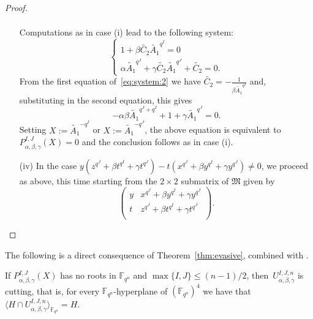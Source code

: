 \begin{proof}
\begin{enumerate}
\begin{equation*}
\begin{split}
\end{split}
\end{equation*}
Computations as in case (i) lead to the following system:
\begin{equation}
\label{eq:system:2}
    \begin{cases}
    1 + \beta \tilde{C_2} \tilde{A_1}^{q^I} = 0 \\
    \alpha \tilde{A_1}^{q^J} + \gamma \tilde{C_2} \tilde{A_1}^{q^J} + \tilde{C_2} = 0.
    \end{cases}
\end{equation}
From the first equation of~\eqref{eq:system:2} we  have $\tilde{C_2} = -\frac{1}{\beta \tilde{A_1}^{q^I}}$ and, substituting in the second equation, this gives
\begin{equation*}
     -\alpha\beta \tilde{A_1}^{q^J + q^I} + 1 + \gamma \tilde{A_1}^{q^J} = 0.
\end{equation*}
Setting $X:= \tilde{A_1}^{-q^{I}}$ or $X:= \tilde{A_1}^{-q^{J}}$, the above equation is equivalent to   $P_{\alpha,\beta,\gamma}^{I,J}(X)=0$
and the conclusion follows as in case (i).

\item[(iv)] In the case $y \left(z^{q^J}+\beta t^{q^I} + \gamma t^{q^J}\right) - t\left(x^{q^J}+\beta y^{q^I} + \gamma y^{q^J}\right)\neq 0$, we proceed as above, this time starting from the $2\times 2$ submatrix of $\mathfrak{M}$ given by 
\begin{equation*}
    \begin{pmatrix}
    y &  x^{q^J}+\beta y^{q^I} + \gamma y^{q^J} \\
    t &  z^{q^J}+\beta t^{q^I} + \gamma t^{q^J} \\
    \end{pmatrix}.
\end{equation*}
\end{enumerate}

\end{proof}

The following is a direct consequence of Theorem~\ref{thm:evasive}, combined with \cite[Theorem~3.3]{BMN2022}.
\begin{coro}\label{cor:minimal}
 If  $P^{I,J}_{\alpha,\beta,\gamma}(X)$ has no roots in $\mathbb{F}_{q^n}$ and $\max\{I,J\}\leq (n-1)/2$, then~$U_{\alpha, \beta, \gamma}^{I,J,n}$ is cutting, that is, for every ${\mathbb F}_{q^n}$-hyperplane of $(\mathbb{F}_{q^n})^{4}$ we have that $\langle H\cap U_{\alpha, \beta, \gamma}^{I,J,n} \rangle_{{\mathbb F}_{q^n}} = H$.  
\end{coro}


